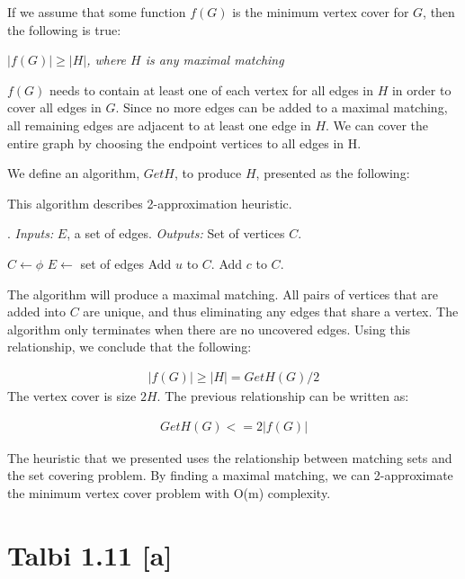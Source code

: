 \documentclass[12pt]{article}
\begin{document}
If we assume that some function $f(G)$ is the minimum vertex cover for $G$, then the following is true:

\textit{$|f(G)| \geq |H|$, where $H$ is any maximal matching}

$f(G)$ needs to contain at least one of each vertex for all edges in $H$ in order to cover all edges in $G$. Since no more edges can be added to a maximal matching, all remaining edges are adjacent to at least one edge in $H$. We can cover the entire graph by choosing the endpoint vertices to all edges in H.

We define an algorithm, $GetH$, to produce $H$, presented as the following:


\begin{algorithm}[ht!]
	\caption{This algorithm describes 2-approximation heuristic. }. \textit{Inputs:} $E$, a set of edges.
	 \textit{Outputs:} Set of vertices $C$.
	\begin{algorithmic}[1]
		
		
		\State $C \gets \phi$ 
		\State $E \gets$ set of edges
		 
		\State Add $u$ to $C$.
		\State Add $c$ to $C$.
		\EndWhile
		\EndProcedure
		
	\end{algorithmic}	
	\label{alg:get2Approx}
\end{algorithm}


The algorithm will produce a maximal matching. All pairs of vertices that are added into $C$ are unique, and thus eliminating any edges that share a vertex. The algorithm only terminates when there are no uncovered edges. Using this relationship, we conclude that the following:

\begin{align*}
|f(G)|  \geq |H| = GetH(G) / 2
\end{align*}
The vertex cover is size $2H$. The previous relationship can be written as:

\begin{align*}
GetH(G) <= 2 |f(G)|
\end{align*}

The heuristic that we presented uses the relationship between matching sets and the set covering problem. By finding a maximal matching, we can 2-approximate the minimum vertex cover problem with O(m) complexity.



\section{Talbi 1.11 [a]}
\end{document}
